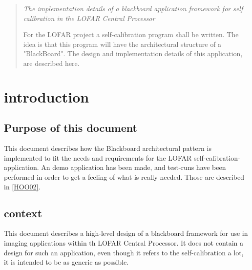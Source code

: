\documentclass[]{lofar}
\begin{document}
  \maketitle

  \begin{abstract}

    \em{The implementation details of a blackboard application
      framework for self calibration in the LOFAR Central Processor}

    For the LOFAR project a self-calibration program shall be
    written. The idea is that this program will have the architectural
    structure of a "BlackBoard". The design and implementation details
    of this application, are described here.
   
  \end{abstract}

  \tableofcontents

  \listoffigures


  \section{introduction}
  \label{sec:introduction}\hypertarget{sec:introduction}{}

    \subsection{Purpose of this document}
    \label{subsec:purpose}\hypertarget{subsec:purpose}{}

      This document describes how the Blackboard architectural pattern
      is implemented to fit the needs and requirements for the LOFAR
      self-calibration-application. An demo application has been made,
      and test-runs have been performed in order to get a feeling of
      what is really needed. Those are described in
      \hyperlink{bib:LOFAR-ASTRON-MEM-096}{[HOO02]}.

    \subsection{context}
    \label{subsec:context}\hypertarget{subsec:context}{}

      This document describes a high-level design of a blackboard
      framework for use in imaging applications within th LOFAR Central
      Processor. It does not contain a design for such an application,
      even though it refers to the self-calibration a lot, it is
      intended to be as generic as possible.
\end{document}

